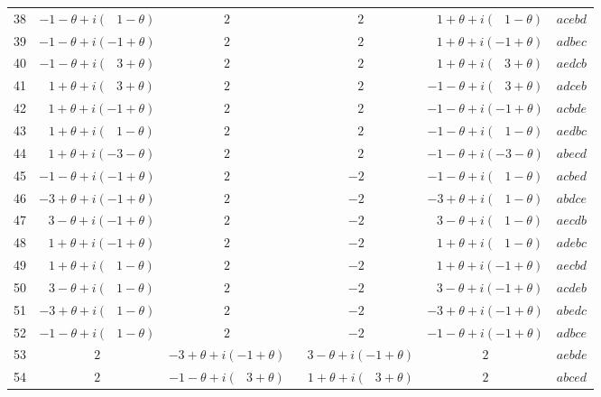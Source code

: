 \documentclass[11pt,a4paper]{article}
\begin{document}
\begin{center}
\begin{longtable}{r|c|c|c|c|l}
38 & $-1 - \theta + i(\;\;\,1 - \theta)$ & $2$ & $\;\;\,2$
         & $\;\;\,1 + \theta + i(\;\;\,1 - \theta)$ & $acebd$\\
39 & $-1 - \theta + i(-1 + \theta)$ & $2$ & $\;\;\,2$
         & $\;\;\,1 + \theta + i(-1 + \theta)$ & $adbec$\\
40 & $-1 - \theta + i(\;\;\,3 + \theta)$ & $2$ & $\;\;\,2$
         & $\;\;\,1 + \theta + i(\;\;\,3 + \theta)$ & $aedcb$\\
41 & $\;\;\,1 + \theta + i(\;\;\,3 + \theta)$ & $2$ & $\;\;\,2$
         & $-1 - \theta + i(\;\;\,3 + \theta)$ & $adceb$\\
42 & $\;\;\,1 + \theta + i(-1 + \theta)$ & $2$ & $\;\;\,2$
         & $-1 - \theta + i(-1 + \theta)$ & $acbde$\\
43 & $\;\;\,1 + \theta + i(\;\;\,1 - \theta)$ & $2$ & $\;\;\,2$
         & $-1 - \theta + i(\;\;\,1 - \theta)$ & $aedbc$\\
44 & $\;\;\,1 + \theta + i(-3 - \theta)$ & $2$ & $\;\;\,2$
         & $-1 - \theta + i(-3 - \theta)$ & $abecd$\\
\hline
45 & $-1 - \theta + i(-1 + \theta)$ & $2$ & $-2$
         & $-1 - \theta + i(\;\;\,1 - \theta)$ & $acbed$\\
46 & $-3 + \theta + i(-1 + \theta)$ & $2$ & $-2$
         & $-3 + \theta + i(\;\;\,1 - \theta)$ & $abdce$\\
47 & $\;\;\,3 - \theta + i(-1 + \theta)$ & $2$ & $-2$
         & $\;\;\,3 - \theta + i(\;\;\,1 - \theta)$ & $aecdb$\\
48 & $\;\;\,1 + \theta + i(-1 + \theta)$ & $2$ & $-2$
         & $\;\;\,1 + \theta + i(\;\;\,1 - \theta)$ & $adebc$\\
49 & $\;\;\,1 + \theta + i(\;\;\,1 - \theta)$ & $2$ & $-2$
         & $\;\;\,1 + \theta + i(-1 + \theta)$ & $aecbd$\\
50 & $\;\;\,3 - \theta + i(\;\;\,1 - \theta)$ & $2$ & $-2$
         & $\;\;\,3 - \theta + i(-1 + \theta)$ & $acdeb$\\
51 & $-3 + \theta + i(\;\;\,1 - \theta)$ & $2$ & $-2$
         & $-3 + \theta + i(-1 + \theta)$ & $abedc$\\
52 & $-1 - \theta + i(\;\;\,1 - \theta)$ & $2$ & $-2$
         & $-1 - \theta + i(-1 + \theta)$ & $adbce$\\
\hline
53 & $2$ & $-3 + \theta + i(-1 + \theta)$
         & $\;\;\,3 - \theta + i(-1 + \theta)$ & $2$ & $aebde$\\
54 & $2$ & $-1 - \theta + i(\;\;\,3 + \theta)$
         & $\;\;\,1 + \theta + i(\;\;\,3 + \theta)$ & $2$ & $abced$\\

\end{longtable}
\end{center}
\end{document}
